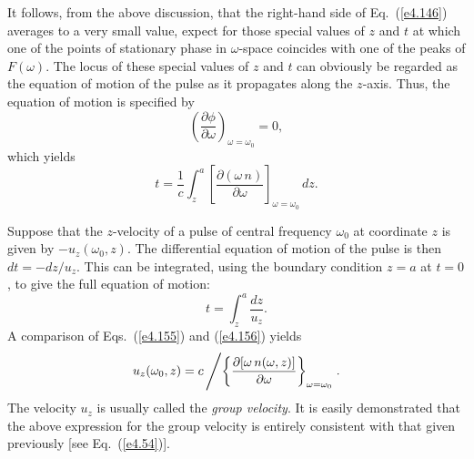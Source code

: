 It follows, from the above discussion,
  that the right-hand side of Eq.~(\ref{e4.146}) averages to a very small
value, expect
for those special values of $z$ and $t$ at which one of the points of stationary
 phase in $\omega$-space coincides with one of the peaks of $F(\omega)$. The
locus of these special values of $z$ and $t$ can obviously be regarded as the
equation of motion of the pulse  as it propagates along the $z$-axis. Thus, the equation of motion is
 specified by
\begin{equation}
\left(\frac{\partial\phi}{\partial\omega}\right)_{\omega=\omega_0} = 0,
\end{equation}
which yields
\begin{equation}\label{e4.155}
t = \frac{1}{c} \int_z^a \left[\frac{\partial(\omega \,n)}{\partial\omega}
\right]_{\omega=\omega_0}\, dz.
\end{equation}

Suppose that the $z$-velocity of a pulse of central frequency $\omega_0$
at coordinate $z$ is given by $-u_z(\omega_0,z)$. The differential
equation of motion of the pulse is then $dt = -dz/u_z$. This can be integrated,
using the boundary condition $z=a$ at $t=0$, to give the full equation
of motion:
\begin{equation}\label{e4.156}
t =\int_z^a \frac{dz}{u_z}.
\end{equation}
A comparison of Eqs.~(\ref{e4.155}) and (\ref{e4.156}) yields
\begin{equation}\label{e4.157}
u_z(\omega_0,z) = c\left/ \left\{\frac{\partial[\omega \,n(\omega,z)]}{\partial\omega}
\right\}_{\omega=\omega_0}\right..
\end{equation}
The velocity $u_z$ is  usually called the
 {\em group velocity}. It is easily demonstrated that
the above expression for the group velocity is
entirely  consistent with that 
given previously [see Eq.~(\ref{e4.54})].

